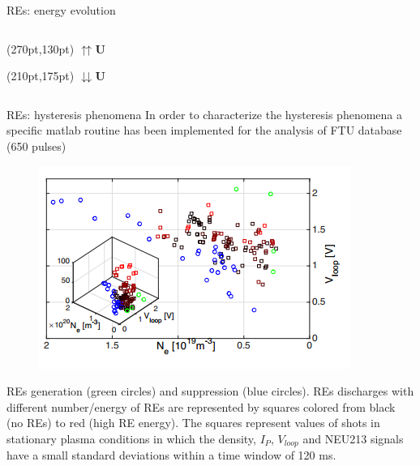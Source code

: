 \documentclass{beamer}
\begin{document}
\begin{frame}{REs: energy evolution}
\begin{columns}
\begin{column}{0.6\textwidth}
\begin{figure}
        \end{figure}

        \begin{textblock*}{10pt}(270pt,130pt)
         $\upuparrows$\textbf{U}
        \end{textblock*}

        \begin{textblock*}{10pt}(210pt,175pt)
         $\downdownarrows$\textbf{U}
        \end{textblock*}
        
        \end{column}
    \end{columns}  

\end{frame}

\begin{frame}{REs: hysteresis phenomena}
    \scriptsize
    In order to characterize the hysteresis phenomena a specific matlab routine has been implemented for the analysis of FTU database (650 pulses)
    \begin{figure}
        \vspace*{-0.4cm}
        \centering
    	\includegraphics[width=0.6\linewidth]{Chapter2Fig/hysteresis2.png}
        \vspace*{-0.6cm}
    \end{figure}
    REs generation (green circles) and suppression (blue circles). REs discharges with different number/energy of REs are represented by squares colored from black (no REs) to red (high RE energy). The squares represent values of shots in stationary plasma conditions in which the density, $I_P$, $V_{loop}$ and NEU213 signals have a small standard deviations within a time window of 120 \si{\ms}.

\end{frame}
\end{document}
